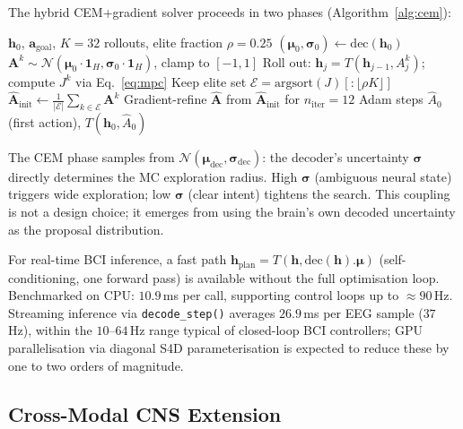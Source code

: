 \documentclass[journal]{IEEEtran}
\begin{document}
The hybrid CEM+gradient solver proceeds in two phases (Algorithm~\ref{alg:cem}):

\begin{algorithm}[t]
\caption{CEM-Guided Latency-Minimising MPC}
\label{alg:cem}
\begin{algorithmic}[1]
\REQUIRE $\mathbf{h}_0$, $\mathbf{a}_\text{goal}$, $K{=}32$ rollouts, elite fraction $\rho{=}0.25$
\STATE $(\bm\mu_0, \bm\sigma_0) \leftarrow \text{dec}(\mathbf{h}_0)$
  \STATE $\mathbf{A}^k \sim \mathcal{N}(\bm\mu_0 \cdot \mathbf{1}_H, \bm\sigma_0 \cdot \mathbf{1}_H)$, clamp to $[-1,1]$
  \STATE Roll out: $\mathbf{h}_j = T(\mathbf{h}_{j-1}, A^k_j)$; compute $J^k$ via Eq.~\ref{eq:mpc}
\ENDFOR
\STATE Keep elite set $\mathcal{E} = \text{argsort}(J)[:\lfloor\rho K\rfloor]$
\STATE $\hat{\mathbf{A}}_\text{init} \leftarrow \frac{1}{|\mathcal{E}|}\sum_{k \in \mathcal{E}} \mathbf{A}^k$  
\STATE Gradient-refine $\hat{\mathbf{A}}$ from $\hat{\mathbf{A}}_\text{init}$ for $n_\text{iter}{=}12$ Adam steps
\RETURN $\hat{A}_0$ (first action), $T(\mathbf{h}_0, \hat{A}_0)$
\end{algorithmic}
\end{algorithm}

The CEM phase samples from $\mathcal{N}(\bm\mu_\text{dec}, \bm\sigma_\text{dec})$: the decoder's uncertainty $\bm\sigma$ directly determines the MC exploration radius.
High $\bm\sigma$ (ambiguous neural state) triggers wide exploration; low $\bm\sigma$ (clear intent) tightens the search.
This coupling is not a design choice; it emerges from using the brain's own decoded uncertainty as the proposal distribution.

For real-time BCI inference, a fast path $\mathbf{h}_\text{plan} = T(\mathbf{h}, \text{dec}(\mathbf{h}).\bm\mu)$ (self-conditioning, one forward pass) is available without the full optimisation loop. Benchmarked on CPU: $10.9$\,ms per call, supporting control loops up to $\approx\!90$\,Hz. Streaming inference via \texttt{decode\_step()} averages $26.9$\,ms per EEG sample ($37$\,Hz), within the $10$--$64$\,Hz range typical of closed-loop BCI controllers; GPU parallelisation via diagonal S4D parameterisation is expected to reduce these by one to two orders of magnitude.

\subsection{Cross-Modal CNS Extension}
\label{sec:crossmodal}
\end{document}
